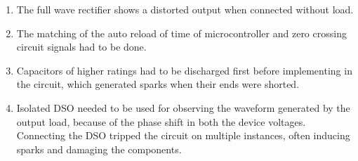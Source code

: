 \begin{enumerate}
			\item The full wave rectifier shows a distorted output when connected without load.
			
			\item The matching of the auto reload of time of microcontroller and zero crossing circuit signals had to be done.
			
			\item Capacitors of higher ratings had to be discharged first before implementing in the circuit, which generated sparks when their ends were shorted.
			
			\item Isolated DSO needed to be used for observing the waveform generated by the output load, because of the phase shift in both the device voltages. Connecting the DSO tripped the circuit on multiple instances, often inducing sparks and damaging the components.
			\end{enumerate}
